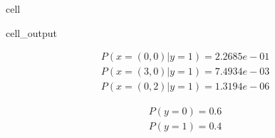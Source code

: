 \documentclass[letterpaper,10pt,english]{jupyterBook}
\begin{document}
\begin{sphinxuseclass}{cell}
\begin{sphinxVerbatimOutput}
\begin{sphinxuseclass}{cell_output}
\begin{sphinxVerbatim}[commandchars=\\\{\}]
\end{sphinxVerbatim}
\begin{equation*}
\begin{split}\displaystyle P(x=(0, 0)|y=1) = 2.2685e-01\end{split}
\end{equation*}\begin{equation*}
\begin{split}\displaystyle P(x=(3, 0)|y=1) = 7.4934e-03\end{split}
\end{equation*}\begin{equation*}
\begin{split}\displaystyle P(x=(0, 2)|y=1) = 1.3194e-06\end{split}
\end{equation*}
\begin{sphinxVerbatim}[commandchars=\\\{\}]

\end{sphinxVerbatim}
\begin{equation*}
\begin{split}\displaystyle P(y=0) = 0.6\end{split}
\end{equation*}\begin{equation*}
\begin{split}\displaystyle P(y=1) = 0.4\end{split}
\end{equation*}
\end{sphinxuseclass}\end{sphinxVerbatimOutput}

\end{sphinxuseclass}
\end{document}
